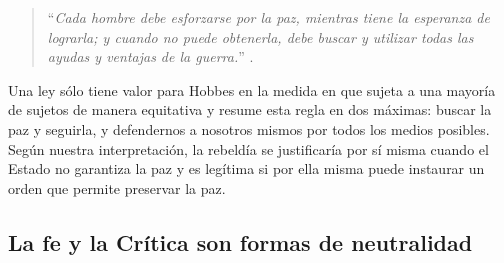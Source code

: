 \begin{quote}
  \enquote{\emph{Cada hombre debe esforzarse por la paz, mientras tiene la esperanza de lograrla; y cuando no puede obtenerla, debe buscar y utilizar todas las ayudas y ventajas de la guerra.}} \autocite[capítulo 14]{hobbesLeviatan2007}.
\end{quote}

Una ley sólo tiene valor para Hobbes en la medida en que sujeta a una mayoría de sujetos de manera equitativa y resume esta regla en dos máximas: buscar la paz y seguirla, y defendernos a nosotros mismos por todos los medios posibles. Según nuestra interpretación, la rebeldía se justificaría por sí misma cuando el Estado no garantiza la paz y es legítima si por ella misma puede instaurar un orden que permite preservar la paz.

\subsection{La fe y la Crítica son formas de neutralidad}
\label{sub:la-fe-y-la-crítica-son-formas-de-neutralidad}


